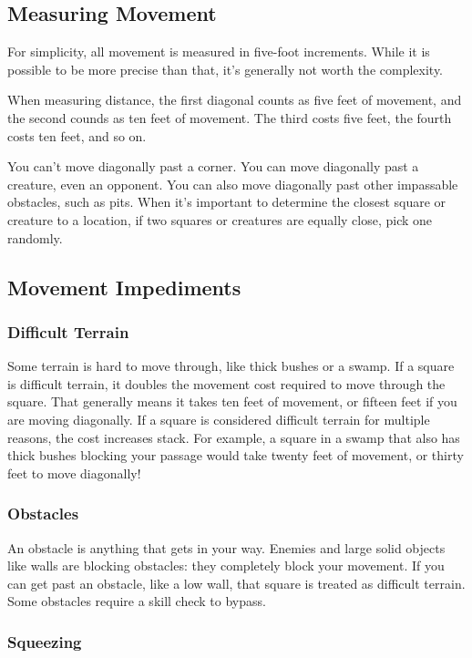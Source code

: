 \subsection{Measuring Movement}
For simplicity, all movement is measured in five-foot increments. While it is possible to be more precise than that, it's generally not worth the complexity.

 When measuring distance, the first diagonal counts as five feet of movement, and the second counds as ten feet of movement. The third costs five feet, the fourth costs ten feet, and so on.

You can't move diagonally past a corner. You can move diagonally past a creature, even an opponent. You can also move diagonally past other impassable obstacles, such as pits.
 When it's important to determine the closest square or creature to a location, if two squares or creatures are equally close, pick one randomly.

\subsection{Movement Impediments}

\subsubsection{Difficult Terrain}
Some terrain is hard to move through, like thick bushes or a swamp. If a square is difficult terrain, it doubles the movement cost required to move through the square. That generally means it takes ten feet of movement, or fifteen feet if you are moving diagonally. If a square is considered difficult terrain for multiple reasons, the cost increases stack. For example, a square in a swamp that also has thick bushes blocking your passage would take twenty feet of movement, or thirty feet to move diagonally!

\subsubsection{Obstacles}
An obstacle is anything that gets in your way. Enemies and large solid objects like walls are blocking obstacles: they completely block your movement. If you can get past an obstacle, like a low wall, that square is treated as difficult terrain. Some obstacles require a skill check to bypass.

\subsubsection{Squeezing}

